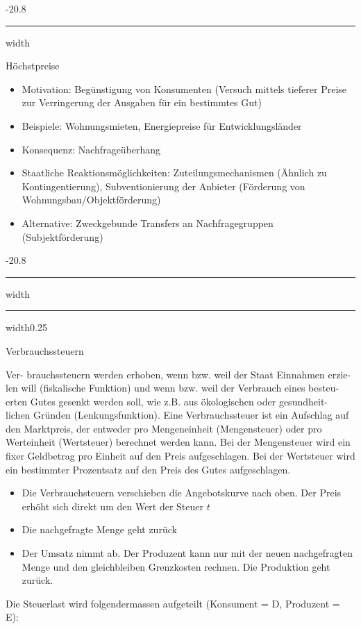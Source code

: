 \documentclass[9pt, landscape, fleqn]{scrartcl}
\makeatletter
\renewcommand{\subsection}{\@startsection{subsection}{1}{0mm}%
{-2\baselineskip}{0.8\baselineskip}%
{\hrule depth 0.2pt width\columnwidth\hrule depth0.75pt
width0.25\columnwidth\vspace*{1.2em}\large\bfseries\rmfamily}}
\renewcommand{\subsubsection}{\@startsection{subsubsection}{1}{0mm}%
{-2\baselineskip}{0.8\baselineskip}%
{\hrule depth 0.2pt width\columnwidth\vspace*{1.2em}\normalsize\bfseries\rmfamily}}
\makeatother
\begin{document}
\begin{multicols*}{3}
\subsubsection{Höchstpreise}

\begin{itemize}
    \item Motivation: Begünstigung von Konsumenten (Versuch mittels tieferer Preise zur Verringerung der Ausgaben für ein bestimmtes Gut)
    \item Beispiele: Wohnungsmieten, Energiepreise für Entwicklungsländer
    \item Konsequenz: Nachfrageüberhang 
    \item Staatliche Reaktionsmöglichkeiten: Zuteilungsmechanismen (Ähnlich zu Kontingentierung), Subventionierung der Anbieter (Förderung von Wohnungsbau/Objektförderung)
    \item Alternative: Zweckgebunde Transfers an Nachfragegruppen (Subjektförderung)
\end{itemize}

\subsection{Verbrauchssteuern}

Ver- brauchssteuern werden erhoben, wenn bzw. weil der Staat Einnahmen erzie- len will (fiskalische Funktion) und wenn bzw. weil der Verbrauch eines besteu- erten Gutes gesenkt werden soll, wie z.B. aus ökologischen oder gesundheit- lichen Gründen (Lenkungsfunktion).
Eine Verbrauchssteuer ist ein Aufschlag auf den Marktpreis, der entweder pro Mengeneinheit (Mengensteuer) oder pro Werteinheit (Wertsteuer) berechnet werden kann. Bei der Mengensteuer wird ein fixer Geldbetrag pro Einheit auf den Preis aufgeschlagen. Bei der Wertsteuer wird ein bestimmter Prozentsatz auf den Preis des Gutes aufgeschlagen.

\begin{itemize}
    \item Die Verbrauchsteuern verschieben die Angebotskurve nach oben. Der Preis erhöht sich direkt um den Wert der Steuer $t$
    \item Die nachgefragte Menge geht zurück
    \item Der Umsatz nimmt ab. Der Produzent kann nur mit der neuen nachgefragten Menge und den gleichbleiben Grenzkosten rechnen. Die Produktion geht zurück.
\end{itemize}

Die Steuerlast wird folgendermassen aufgeteilt (Konsument = D, Produzent = E):


\end{multicols*}
\end{document}
